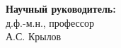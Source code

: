 \begin{titlepage}
\vfill
\begin{flushright}
\large 
\textbf{Научный руководитель:}\\
д.ф.-м.н., профессор\\
А.С. Крылов
\end{flushright}
 

\vfill %

\end{titlepage}%
